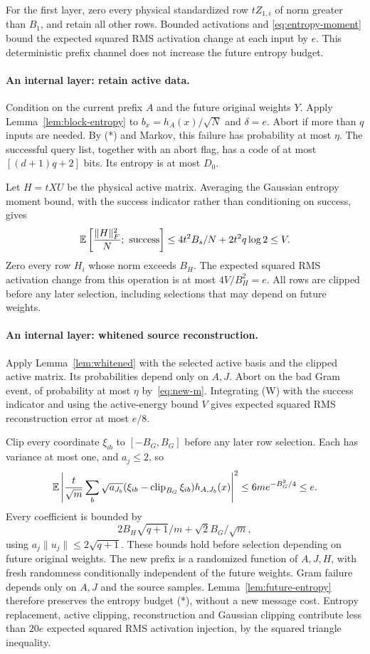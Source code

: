 For the first layer, zero every physical standardized row $tZ_{1,i}$ of norm
greater than $B_1$, and retain all other rows. Bounded activations and
\eqref{eq:entropy-moment} bound the expected squared RMS activation change
at each input by $e$. This deterministic prefix channel does not increase the
future entropy budget.

\paragraph{An internal layer: retain active data.}
Condition on the current prefix $A$ and the future original weights $Y$.
Apply Lemma~\ref{lem:block-entropy} to
$b_x=h_A(x)/\sqrt N$ and $\delta=e$. Abort if more than $q$ inputs are needed.
By (*) and Markov, this failure has probability at most $\eta$.
The successful query list, together with an abort flag, has a code of at most
$[(d+1)q+2]$ bits. Its entropy is at most $D_0$.

Let $H=tXU$ be the physical active matrix. Averaging the Gaussian entropy
moment bound, with the success indicator rather than conditioning on success, gives
\[
 \E\left[\frac{\|H\|_F^2}{N};\ \text{success}\right]
 \le4t^2B_s/N+2t^2q\log2\le V.
\]
Zero every row $H_i$ whose norm exceeds $B_H$. The expected squared RMS
activation change from this operation is at most $4V/B_H^2=e$.
All rows are clipped before any later selection, including selections that
may depend on future weights.


\paragraph{An internal layer: whitened source reconstruction.}
Apply Lemma~\ref{lem:whitened} with the selected active basis and the clipped
active matrix. Its probabilities depend only on $A,J$. Abort on the bad
Gram event, of probability at most $\eta$ by~\eqref{eq:new-m}. Integrating
(W) with the success indicator and using the active-energy bound $V$ gives
expected squared RMS reconstruction error at most $e/8$.

Clip every coordinate $\xi_{ib}$ to $[-B_G,B_G]$ before any later row
selection. Each has variance at most one, and $a_j\le2$, so
\[
 \mathbb E\left|\frac{t}{\sqrt m}\sum_b\sqrt{a_{J_b}}
 (\xi_{ib}-\operatorname{clip}_{B_G}\xi_{ib})h_{A,J_b}(x)\right|^2
 \le6m e^{-B_G^2/4}\le e.
\]
Every coefficient is bounded by
\[
 2B_H\sqrt{q+1}/m+\sqrt2 B_G/\sqrt m,
\]
using $a_j\|u_j\|\le2\sqrt{q+1}$. These bounds hold before selection
depending on future original weights. The new prefix is a randomized
function of $A,J,H$, with fresh randomness conditionally independent of the
future weights. Gram failure depends only on $A,J$ and the source samples.
Lemma~\ref{lem:future-entropy} therefore preserves the entropy budget (*),
without a new message cost. Entropy replacement, active clipping,
reconstruction and Gaussian clipping contribute less than $20e$ expected
squared RMS activation injection, by the squared triangle inequality.

